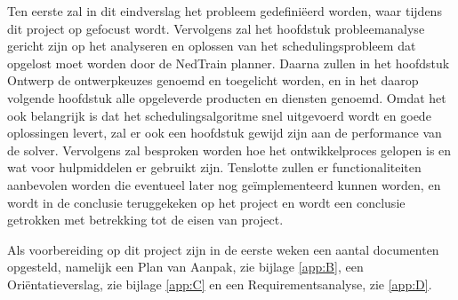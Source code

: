 Ten eerste zal in dit eindverslag het probleem gedefini\"eerd worden, waar tijdens dit project op gefocust wordt. Vervolgens zal het hoofdstuk probleemanalyse gericht zijn op het analyseren en oplossen van het schedulingsprobleem dat opgelost moet worden door de NedTrain planner. Daarna zullen in het hoofdstuk Ontwerp de ontwerpkeuzes genoemd en toegelicht worden, en in het daarop volgende hoofdstuk alle opgeleverde producten en diensten genoemd. Omdat het ook belangrijk is dat het schedulingsalgoritme snel uitgevoerd wordt en goede oplossingen levert, zal er ook een hoofdstuk gewijd zijn aan de performance van de solver. Vervolgens zal besproken worden hoe het ontwikkelproces gelopen is en wat voor hulpmiddelen er gebruikt zijn. Tenslotte zullen er functionaliteiten aanbevolen worden die eventueel later nog ge\"implementeerd kunnen worden, en wordt in de conclusie teruggekeken op het project en wordt een conclusie getrokken met betrekking tot de eisen van project.

Als voorbereiding op dit project zijn in de eerste weken een aantal documenten opgesteld, namelijk een Plan van Aanpak, zie bijlage \ref{app:B}, een Ori\"entatieverslag, zie bijlage \ref{app:C} en een Requirementsanalyse, zie \ref{app:D}.
